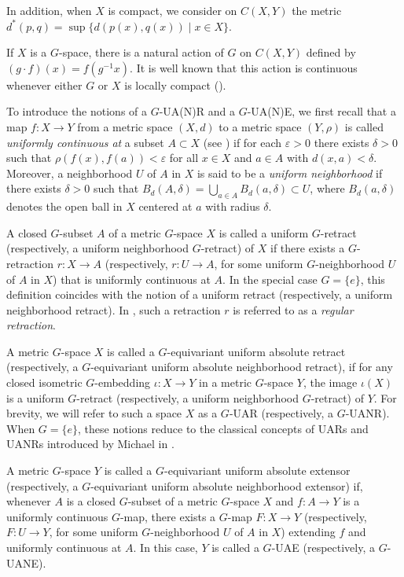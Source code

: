 \documentclass[12pt]{amsart}
\theoremstyle{definition}
\begin{document}
	In addition, when $X$ is compact, we consider on $C(X,Y)$ the metric $d^*(p,q)=\sup\{d(p(x),q(x)) \mid x\in X\}$. 
	
	If $X$ is a $G$-space, there is a natural action of $G$ on $C(X,Y)$ defined by $(g\cdot f)(x)=f(g^{-1}x)$. It is well known that this action is continuous whenever either $G$ or $X$ is locally compact (\cite[Proposition 4]{A3}).
	
	\medskip
	
	To introduce the notions of a $G$-UA(N)R and a $G$-UA(N)E, we first recall that a map $f:X\rightarrow Y$ from a metric space $(X,d)$ to a metric space $(Y,\rho)$ is called \textit{uniformly continuous at} a subset $A\subset X$ (see \cite{EM1}) if for each $\varepsilon>0$ there exists $\delta>0$ such that $\rho(f(x),f(a))<\varepsilon$ for all $x\in X$ and $a\in A$ with $d(x,a)<\delta$. Moreover, a neighborhood $U$ of $A$ in $X$ is said to be a \textit{uniform neighborhood} if there exists $\delta > 0$ such that $B_d(A,\delta) = \bigcup_{a \in A} B_d(a,\delta) \subset U$, where $B_d(a,\delta)$  denotes the open ball in $X$ centered at $a$ with radius $\delta$. 
		
	A closed $G$-subset $A$ of a metric $G$-space $X$ is called a uniform $G$-retract (respectively, a uniform neighborhood $G$-retract) of $X$ if there exists a $G$-retraction $r: X\rightarrow A$ (respectively, $r: U\rightarrow A$, for some uniform $G$-neighborhood $U$ of $A$ in $X$) that is uniformly continuous at $A$. In the special case $G=\{e\}$, this definition coincides with the notion of a uniform retract (respectively, a uniform neighborhood retract). In \cite{HT1,HT2}, such a retraction $r$ is referred to as a \textit{regular retraction}.
	
	A metric $G$-space $X$ is called a $G$-equivariant uniform absolute retract (respectively, a $G$-equivariant uniform absolute neighborhood retract), if for any closed isometric $G$-embedding $\iota: X\rightarrow Y$ in a metric $G$-space $Y$, the image $\iota(X)$ is a uniform $G$-retract (respectively, a uniform neighborhood $G$-retract) of $Y$. For brevity, we will refer to such a space $X$ as a $G$-UAR (respectively, a $G$-UANR). When $G=\{e\}$, these notions reduce to the classical concepts of UARs and UANRs introduced by Michael in \cite{EM1}.
	
	A metric $G$-space $Y$ is called a $G$-equivariant uniform absolute extensor (respectively, a $G$-equivariant uniform absolute neighborhood extensor) if, whenever $A$ is a closed $G$-subset of a metric $G$-space $X$ and $f:A \to Y$ is a uniformly continuous $G$-map, there exists a $G$-map $F : X \to Y$ (respectively, $F : U \to Y$, for some uniform $G$-neighborhood $U$ of $A$ in $X$) extending $f$ and uniformly continuous at $A$. In this case, $Y$ is called a $G$-UAE (respectively, a $G$-UANE).
	
\end{document}
